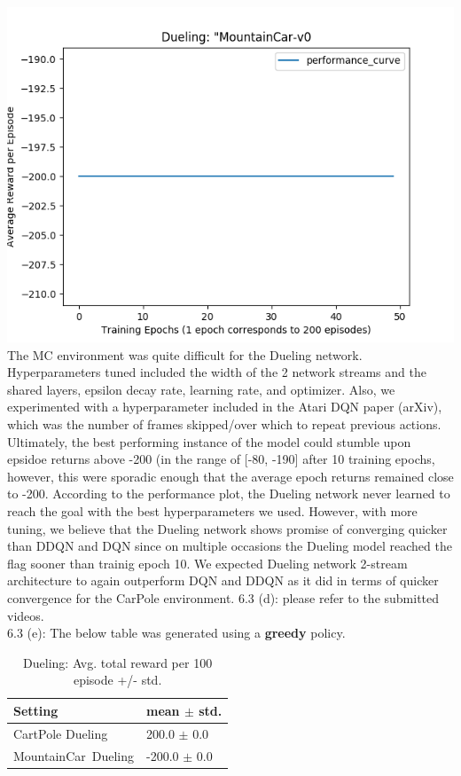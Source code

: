 \documentclass[12pt]{article}
\begin{document}
\begin{tcolorbox}[fit,height=22cm, width=\textwidth, blank, borderline={1pt}{-2pt},nobeforeafter]
    \includegraphics[width=.5\textwidth]{figures/MC_dueling_performance_curve}\\ 
    The MC environment was quite difficult for the Dueling network. Hyperparameters tuned included the width of the 2 network streams and the shared layers, epsilon decay rate, learning rate, and optimizer. Also, we experimented with a hyperparameter included in the Atari DQN paper (arXiv), which was the number of frames skipped/over which to repeat previous actions. Ultimately, the best performing instance of the model could stumble upon epsidoe returns above -200 (in the range of [-80, -190] after 10 training epochs, however, this were sporadic enough that the average epoch returns remained close to -200. According to the performance plot, the Dueling network never learned to reach the goal with the best hyperparameters we used. However, with more tuning, we believe that the Dueling network shows promise of converging quicker than DDQN and DQN since on multiple occasions the Dueling model reached the flag sooner than trainig epoch 10. We expected Dueling network 2-stream architecture to again outperform DQN and DDQN as it did in terms of quicker convergence for the CarPole environment.
    {\large 6.3 (d):} please refer to the submitted videos. \\
    {\large 6.3 (e):} The below table was generated using a \textbf{greedy} policy.
        \begin{table}[H]
    	\centering
    	\caption{ Dueling:  Avg. total reward per 100 episode +/- std.}
    	\begin{tabular}{|p{9.43em}|r|}
    		\hline
    		\textbf{\small Setting} & \multicolumn{1}{p{10.645em}|}{\textbf{ \small mean $\pm$ std.}} \\
    		\hline
    		{\small CartPole Dueling} & \multicolumn{1}{l|}{\footnotesize 200.0 $\pm$ 0.0}  \\
    		\hline
    		{\small MountainCar Dueling} & \multicolumn{1}{l|}{\footnotesize -200.0 $\pm$ 0.0} \\
    		\hline
    	\end{tabular}%
    	\label{tab4}%
    \end{table}%
    \end{tcolorbox}
\end{document}
